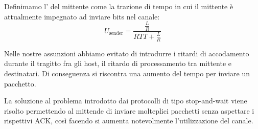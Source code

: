\documentclass{book}
\newcommand{\tmop}[1]{\ensuremath{\operatorname{#1}}}
\newcommand{\tmtextbf}[1]{\text{{\bfseries{#1}}}}
\begin{document}
Definimamo l'\tmtextbf{utilizzazione} del mittente come la trazione di tempo
in cui il mittente {\`e} attualmente impegnato ad inviare bits nel canale:
\[ U_{\tmop{sender}} = \frac{\frac{L}{R}}{R T T + \frac{L}{R}} \]
{}

Nelle nostre assunzioni abbiamo evitato di introdurre i ritardi di accodamento
durante il tragitto fra gli host, il ritardo di processamento tra mittente e
destinatari. Di conseguenza si riscontra una aumento del tempo per inviare un
pacchetto.

La soluzione al problema introdotto dai protocolli di tipo stop-and-wait viene
risolto permettendo al mittende di inviare molteplici pacchetti senza
aspettare i rispettivi ACK, cos{\`i} facendo si aumenta notevolmente
l'utilizzazione del canale.
\end{document}
